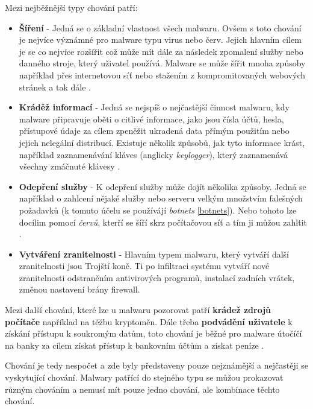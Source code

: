 Mezi nejběžnější typy chování patří: 
\begin{itemize}
    \item \textbf{Šíření} - Jedná se o základní vlastnost všech malwaru. Ovšem s toto chování je nejvíce význámné pro malware typu virus nebo červ. Jejich hlavním cílem je se co nejvíce rozšířit což může mít dále za následek zpomalení služby nebo danného stroje, který uživatel používá. Malware se může šířit mnoha způsoby například přes internetovou síť nebo stažením z kompromitovaných webových stránek a tak dále \cite{article_malware}.
    \item \textbf{Kráděž informací} - Jedná se nejspíš o nejčastější činnost malwaru, kdy malware připravuje oběti o citlivé informace, jako jsou čísla účtů, hesla, přístupové údaje za cílem zpeněžit ukradená data přímým použitím nebo jejich nelegální distribucí. Existuje několik způsobů, jak tyto informace krást, například zaznamenávání kláves (anglicky \textit{keylogger}), který zaznamenává všechny zmáčnuté klávesy \cite{data_stealing}.
    \item \textbf{Odepření služby} - K odepření služby může dojít několika způsoby. Jedná se například o zahlcení nějaké služby nebo serveru velkým množstvím falešných požadavků (k tomuto účelu se používájí \textit{botnets} \ref{botnets}). Nebo tohoto lze docílim pomocí \textit{červů}, kterří se šíří skrz počítačovou síť a tím ji můžou zahltit \cite{dos}.
    \item \textbf{Vytváření zranitelnosti} - Hlavním typem malwaru, který vytváří další zranitelnosti jsou Trojští koně. Ti po infiltraci systému vytváří nové zranitelnosti odstraněním antivirových programů, instalací zadních vrátek, změnou nastavení brány firewall.
\end{itemize}

Mezi další chování, které lze u malwaru pozorovat patří \textbf{krádež zdrojů počítače} například na těžbu kryptoměn. Dále třeba \textbf{podvádění uživatele} k získání přístupu k soukromým datům, toto chování je běžné pro malware útočíčí na banky za cílem získat přístup k bankovním účtům a získat peníze \cite{article_malware}.

Chování je tedy nespočet a zde byly představeny pouze nejznámější a nejčastěji se vyskytující chování. Malwary patřící do stejného typu se můžou prokazovat různým chováním a nemusí mít pouze jedno chování, ale kombinace těchto chování.
